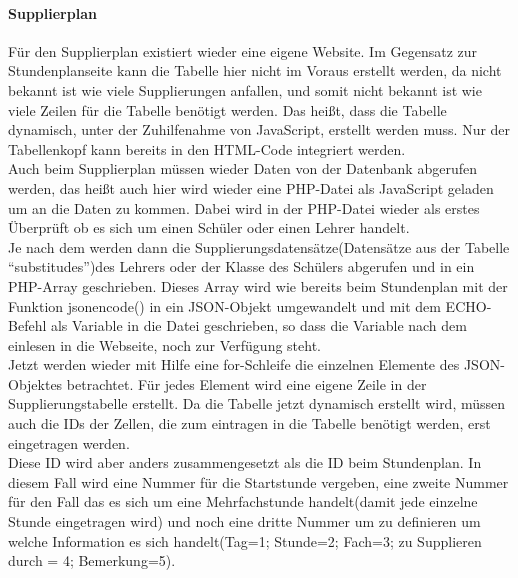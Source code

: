 \paragraph{Supplierplan\\}
Für den Supplierplan existiert wieder eine eigene Website. Im Gegensatz zur Stundenplanseite kann die Tabelle hier nicht im Voraus erstellt werden, da nicht bekannt ist wie viele Supplierungen anfallen, und somit nicht bekannt ist wie viele Zeilen für die Tabelle benötigt werden. Das heißt, dass die Tabelle dynamisch, unter der Zuhilfenahme von JavaScript, erstellt werden muss. Nur der Tabellenkopf kann bereits in den HTML-Code integriert werden.\\
Auch beim Supplierplan müssen wieder Daten von der Datenbank abgerufen werden, das heißt auch hier wird wieder eine PHP-Datei als JavaScript geladen um an die Daten zu kommen. Dabei wird in der PHP-Datei wieder als erstes Überprüft ob es sich um einen Schüler oder einen Lehrer handelt.\\
Je nach dem werden dann die Supplierungsdatensätze(Datensätze aus der Tabelle \enquote{substitudes})des Lehrers oder der Klasse des Schülers abgerufen und in ein PHP-Array geschrieben. Dieses Array wird wie bereits beim Stundenplan mit der Funktion jsonencode() in ein JSON-Objekt umgewandelt und mit dem ECHO-Befehl als Variable in die Datei geschrieben, so dass die Variable nach dem einlesen in die Webseite, noch zur Verfügung steht.\\
Jetzt werden wieder mit Hilfe eine for-Schleife die einzelnen Elemente des JSON-Objektes betrachtet. Für jedes Element wird eine eigene Zeile in der Supplierungstabelle erstellt. Da die Tabelle jetzt dynamisch erstellt wird, müssen auch die IDs der Zellen, die zum eintragen in die Tabelle benötigt werden, erst eingetragen werden.\\
Diese ID wird aber anders zusammengesetzt als die ID beim Stundenplan. In diesem Fall wird eine Nummer für die Startstunde vergeben, eine zweite Nummer für den Fall das es sich um eine Mehrfachstunde handelt(damit jede einzelne Stunde eingetragen wird) und noch eine dritte Nummer um zu definieren um welche Information es sich handelt(Tag=1; Stunde=2; Fach=3; zu Supplieren durch = 4; Bemerkung=5).\\

